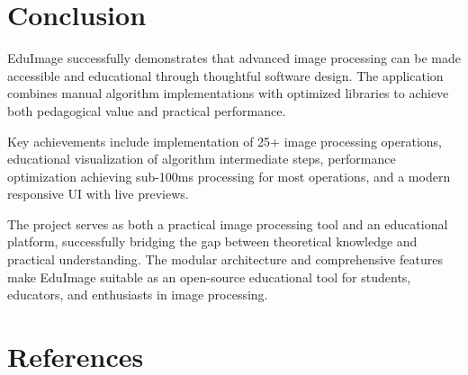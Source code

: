 \documentclass[12pt,a4paper]{article}
\begin{document}
\section{Conclusion}

EduImage successfully demonstrates that advanced image processing can be made accessible and educational through thoughtful software design. The application combines manual algorithm implementations with optimized libraries to achieve both pedagogical value and practical performance.

Key achievements include implementation of 25+ image processing operations, educational visualization of algorithm intermediate steps, performance optimization achieving sub-100ms processing for most operations, and a modern responsive UI with live previews.

The project serves as both a practical image processing tool and an educational platform, successfully bridging the gap between theoretical knowledge and practical understanding. The modular architecture and comprehensive features make EduImage suitable as an open-source educational tool for students, educators, and enthusiasts in image processing.

\section{References}
\end{document}
